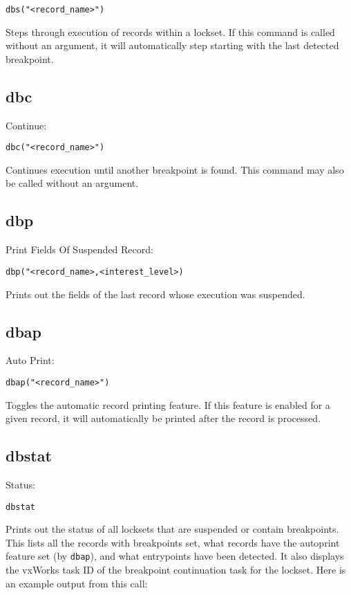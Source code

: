 \begin{verbatim}dbs("<record_name>")
\end{verbatim}Steps through execution of records within a lockset. If this command is called without an argument, it will automatically 
step starting with the last detected breakpoint.

\subsection{dbc}

Continue:

\begin{verbatim}dbc("<record_name>")
\end{verbatim}Continues execution until another breakpoint is found. This command may also be called without an argument.

\subsection{dbp }

Print Fields Of Suspended Record:

\begin{verbatim}dbp("<record_name>,<interest_level>)
\end{verbatim}Prints out the fields of the last record whose execution was suspended.

\subsection{dbap}

Auto Print:

\begin{verbatim}dbap("<record_name>")
\end{verbatim}Toggles the automatic record printing feature. If this feature is enabled for a given record, it will automatically be printed 
after the record is processed.

\subsection{dbstat}

Status:

\begin{verbatim}dbstat
\end{verbatim}Prints out the status of all locksets that are suspended or contain breakpoints. This lists all the records with breakpoints 
set, what records have the autoprint feature set (by \verb|dbap|), and what entrypoints have been detected. It also displays the 
vxWorks task ID of the breakpoint continuation task for the lockset. Here is an example output from this call:


